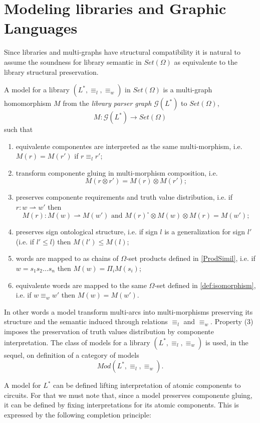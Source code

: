 \documentclass[oribibl]{llncs}
\newcommand{\G}{\mathcal{G}}
\begin{document}
\section{Modeling libraries and Graphic Languages}\label{modeling libraries}

Since libraries and multi-graphs have structural compatibility it is natural to assume the soundness for library semantic in $Set(\Omega)$ as equivalente to the library structural preservation.

A model for a library $(L^\ast,\equiv_l,\equiv_w)$ in $Set(\Omega)$ is a multi-graph homomorphism $M$ from the \emph{library parser graph} $\G(L^\ast)$ to $Set(\Omega)$,
\[M:\G(L^\ast)\rightarrow Set(\Omega)\] such that
\begin{enumerate}
  \item equivalente componentes are interpreted as the same multi-morphism, i.e. $M(r)=M(r')$ if $r\equiv_l r'$;
  \item transform componente gluing in multi-morphism composition, i.e. $${M(r\otimes r')=M(r)\otimes M(r');}$$
  \item preserves componente requirements and truth value distribution, i.e. if $r:w\rightharpoonup w'$ then $$M(r):M(w)\rightharpoonup M(w') \text{ and } M(r)^\circ\otimes M(w)\otimes M(r)= M(w');$$
  \item preserves sign ontological structure, i.e. if sign $l$ is a generalization for sign $l'$ (i.e. if $l'\leq l$) then $M(l')\leq M(l)$;
  \item words are mapped to as chains of $\Omega$-set products defined in \ref{ProdSimil}, i.e. if $w=s_1s_2\ldots s_n$ then $M(w)=\Pi_iM(s_i)$;
  \item equivalente words are mapped to the same $\Omega$-set defined in \ref{def:isomorphism}, i.e. if $w\equiv_w w'$ then $M(w)= M(w')$.
\end{enumerate}
In other words a model transform multi-arcs into multi-morphisms preserving its structure and the semantic induced through relations $\equiv_l$ and $\equiv_w$. Property (3) imposes the preservation of truth values distribution by componente interpretation. The class of models for a library $(L^\ast,\equiv_l,\equiv_w)$ is used, in the sequel, on definition of a category of models \[Mod(L^\ast,\equiv_l,\equiv_w).\]

A model for $L^\ast$ can be defined lifting interpretation of atomic components to circuits. For that we must note that, since a model preserves componente gluing, it can be defined by fixing interpretations for its atomic components. This is expressed by the following completion principle:
\end{document}
